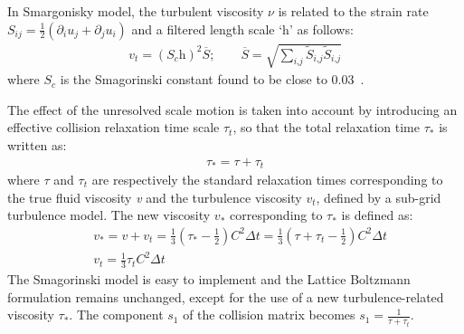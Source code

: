 In Smargonisky model, the turbulent viscosity $\nu$ is related to the strain rate $S_{ij}=\frac{1}{2}(\partial_i u_j + \partial_j u_i)$ and a filtered length scale `h' as follows:
\begin{align}
\textit{v}_{\textit{t}}=(\textit{S}_{c}\textit{h})^{2}\overline{S}; \qquad \overline{S}=\sqrt{\sum\limits_{\textit{i,j}}{\tilde{S}_{\textit{i,j}}\tilde{S}_{\textit{i,j}}}}
\end{align}
where $\textit{S}_{c}$ is the Smagorinski constant found to be close to 0.03~\citep{yu2005}. 

The effect of the unresolved scale motion is taken into account by introducing an effective collision relaxation time scale $\tau_{t}$, so that the total relaxation time $\tau_{*}$ is written as:
\begin{align}
\tau_{*}=\tau + \tau_{t}
\end{align} 
where $\tau$ and $\tau_{t}$ are respectively the standard relaxation times corresponding to the true fluid viscosity \textit{v} and the turbulence viscosity $\textit{v}_{\textit{t}}$, defined by a sub-grid turbulence model. The new viscosity $\textit{v}_{*}$ corresponding to $\tau_{*}$ is defined as:
\begin{align}
& \textit{v}_{*}=\textit{v}+\textit{v}_{\textit{t}}=\frac{1}{3}(\tau_{*}-\frac{1}{2})\textit{C}^{2} \Delta \textit{t} =\frac{1}{3}(\tau+\tau_{t}-\frac{1}{2})\textit{C}^{2} \Delta \textit{t}  \\
& \textit{v}_{\textit{t}}=\frac{1}{3}\tau_{\textit{t}}\textit{C}^{2} \Delta \textit{t}
\end{align} 
The Smagorinski model is easy to implement and the Lattice Boltzmann formulation remains unchanged, except for the use of a new turbulence-related viscosity $\tau_{*}$. The component $s_1$ of the collision matrix becomes $s_1 = \frac{1}{\tau+\tau_t}$.

